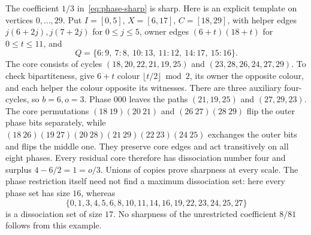 \documentclass[11pt]{article}
\begin{document}
The coefficient $1/3$ in~\eqref{eq:phase-sharp} is sharp. Here is
an explicit template on vertices $0,\ldots,29$. Put $I=[0,5]$,
$X=[6,17]$, $C=[18,29]$, with helper edges $j(6+2j),j(7+2j)$ for
$0\le j\le5$, owner edges $(6+t)(18+t)$ for $0\le t\le11$, and
\[
 Q=\{6\!:\!9,\ 7\!:\!8,\ 10\!:\!13,\ 11\!:\!12,
       \ 14\!:\!17,\ 15\!:\!16\}.
\]
The core consists of cycles $(18,20,22,21,19,25)$ and
$(23,28,26,24,27,29)$. To check bipartiteness, give $6+t$ colour
$\lfloor t/2\rfloor\bmod2$, its owner the opposite colour, and each
helper the colour opposite its witnesses. There are three auxiliary
four-cycles, so $b=6,o=3$. Phase $000$ leaves the paths $(21,19,25)$
and $(27,29,23)$. The core permutations $(18\ 19)(20\ 21)$ and
$(26\ 27)(28\ 29)$ flip the outer phase bits separately, while
$(18\ 26)(19\ 27)(20\ 28)(21\ 29)(22\ 23)(24\ 25)$ exchanges the
outer bits and flips the middle one. They preserve core edges and act
transitively on all eight phases. Every residual core therefore has
dissociation number four and surplus $4-6/2=1=o/3$. Unions of copies
prove sharpness at every scale. The phase restriction itself need not
find a maximum dissociation set: here every phase set has size $16$,
whereas
\[
 \{0,1,3,4,5,6,8,10,11,14,16,19,22,23,24,25,27\}
\]
is a dissociation set of size $17$. No sharpness of the unrestricted
coefficient $8/81$ follows from this example.
\end{document}
